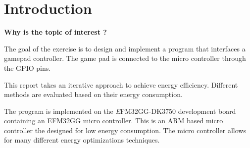 \section{Introduction}
{\bf Why is the topic of interest ?}



The goal of the exercise is to design and implement a program that interfaces a gamepad controller. The game pad is connected to the micro controller through the GPIO pins.  





This report takes an iterative approach to achieve energy efficiency. Different methods are evaluated based on their energy consumption. 

The program is implemented on the \emph EFM32GG-DK3750 development board containing an EFM32GG micro controller. This is an ARM based micro controller the designed for low energy consumption. The micro controller allows for many different energy optimizations techniques.    


